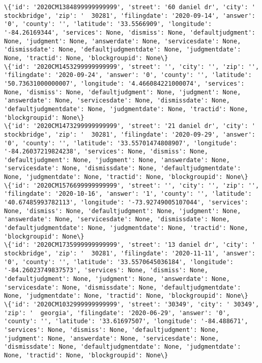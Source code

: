 \documentclass[11pt]{article}
\begin{document}
\begin{Verbatim}[commandchars=\\\{\}]
\{'id': '2020CM1384899999999999', 'street': '60 daniel dr', 'city': '  stockbridge', 'zip': '  30281', 'filingdate': '2020-09-14', 'answer': '0', 'county': '', 'latitude': '33.5566909', 'longitude': '-84.26169344', 'services': None, 'dismiss': None, 'defaultjudgment': None, 'judgment': None, 'answerdate': None, 'servicesdate': None, 'dismissdate': None, 'defaultjudgmentdate': None, 'judgmentdate': None, 'tractid': None, 'blockgroupid': None\}
\{'id': '2020CM1453299999999999', 'street': '', 'city': '', 'zip': '', 'filingdate': '2020-09-24', 'answer': '0', 'county': '', 'latitude': '50.73631000000007', 'longitude': '4.466084221000074', 'services': None, 'dismiss': None, 'defaultjudgment': None, 'judgment': None, 'answerdate': None, 'servicesdate': None, 'dismissdate': None, 'defaultjudgmentdate': None, 'judgmentdate': None, 'tractid': None, 'blockgroupid': None\}
\{'id': '2020CM1473299999999999', 'street': '21 daniel dr', 'city': '  stockbridge', 'zip': '  30281', 'filingdate': '2020-09-29', 'answer': '0', 'county': '', 'latitude': '33.55701474808907', 'longitude': '-84.26037219824238', 'services': None, 'dismiss': None, 'defaultjudgment': None, 'judgment': None, 'answerdate': None, 'servicesdate': None, 'dismissdate': None, 'defaultjudgmentdate': None, 'judgmentdate': None, 'tractid': None, 'blockgroupid': None\}
\{'id': '2020CM1576699999999999', 'street': '', 'city': '', 'zip': '', 'filingdate': '2020-10-16', 'answer': '1', 'county': '', 'latitude': '40.67485993782113', 'longitude': '-73.92749005107044', 'services': None, 'dismiss': None, 'defaultjudgment': None, 'judgment': None, 'answerdate': None, 'servicesdate': None, 'dismissdate': None, 'defaultjudgmentdate': None, 'judgmentdate': None, 'tractid': None, 'blockgroupid': None\}
\{'id': '2020CM1735999999999999', 'street': '13 daniel dr', 'city': '  stockbridge', 'zip': '  30281', 'filingdate': '2020-11-11', 'answer': '0', 'county': '', 'latitude': '33.5570645036184', 'longitude': '-84.26023749837573', 'services': None, 'dismiss': None, 'defaultjudgment': None, 'judgment': None, 'answerdate': None, 'servicesdate': None, 'dismissdate': None, 'defaultjudgmentdate': None, 'judgmentdate': None, 'tractid': None, 'blockgroupid': None\}
\{'id': '2020CM1032999999999999', 'street': '30349', 'city': ' 30349', 'zip': '  georgia', 'filingdate': '2020-06-29', 'answer': '0', 'county': '', 'latitude': '33.61697507', 'longitude': '-84.488671', 'services': None, 'dismiss': None, 'defaultjudgment': None, 'judgment': None, 'answerdate': None, 'servicesdate': None, 'dismissdate': None, 'defaultjudgmentdate': None, 'judgmentdate': None, 'tractid': None, 'blockgroupid': None\}

\end{Verbatim}
\end{document}
